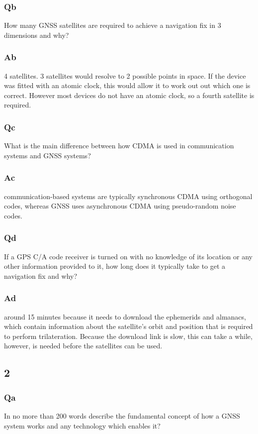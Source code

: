 \documentclass[11pt]{article}
\begin{document}
\subsubsection{Qb}
How many GNSS satellites are required to achieve a navigation fix in 3 dimensions and why?
\subsubsection{Ab}

4 satellites. 3 satellites would resolve to 2 possible points in space. If the device was fitted with an atomic clock, this would allow it to work out out which one is correct. However most devices do not have an atomic clock, so a fourth satellite is required.

\subsubsection{Qc}
What is the main difference between how CDMA is used in communication systems and GNSS systems?
\subsubsection{Ac}

communication-based systems are typically synchronous CDMA using orthogonal codes, whereas GNSS uses asynchronous CDMA using pseudo-random noise codes.
\subsubsection{Qd}
If a GPS C/A code receiver is turned on with no knowledge of its location or any other information provided to it, how long does it typically take to get a navigation fix and why?
\subsubsection{Ad}

around 15 minutes because it needs to download the ephemerids and almanacs, which contain information about the satellite's orbit and position that is required to perform trilateration. Because the download link is slow, this can take a while, however, is needed before the satellites can be used.

\subsection{2}

\subsubsection{Qa}
In no more than 200 words describe the fundamental concept of how a GNSS system works and any technology which enables it?
\end{document}
